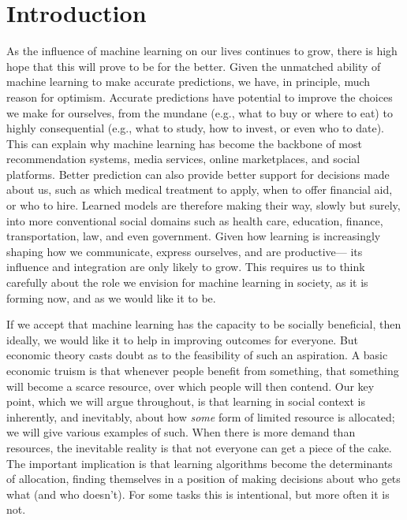 
\section{Introduction} \label{sec:intro}


As the influence of machine learning on our lives continues to grow,
there is high hope that this will prove to be for the better.
Given the unmatched ability of machine learning to make accurate predictions,
we have,
in principle,
much reason for optimism.
Accurate predictions have potential
to improve the choices we make for ourselves,
from the mundane (e.g., what to buy or where to eat)
to highly consequential (e.g., what to study, how to invest, or even who to date).
This can explain why 
machine learning has become 
the backbone of most
recommendation systems,
media services,
online marketplaces,
and social platforms.
Better prediction can also provide better support for
decisions made about us, such as
which medical treatment to apply,
when to offer financial aid,
or who to hire.
Learned models are therefore making their way,
slowly but surely,
into more conventional social domains
such as health care, 
education,
finance,
transportation,
law,
and even government.
Given how learning is increasingly shaping
how we communicate, express ourselves, and are productive---%
its influence and integration are only likely to grow.
This requires us to think carefully about the role we envision for machine learning in society, as it is forming now, and as we would like it to be.

If we accept that machine learning has the capacity to be socially beneficial, 
then ideally, we would like it to help in improving outcomes for everyone.
But economic theory casts doubt as to the feasibility of such an aspiration.
A basic economic truism is that
whenever people benefit from something,
that something will become a scarce resource,
over which people will then contend.
Our key point, which we will argue throughout,
is that learning in social context is inherently, and inevitably,
about how \emph{some} form of limited resource is allocated;
we will give various examples of such.
When there is more demand than resources,
the inevitable reality is that
not everyone can get a piece of the cake.
The important implication is that %
learning algorithms become the determinants of allocation,
finding themselves in a position of making
decisions about who gets what (and who doesn't). 
For some tasks this is intentional, but more often it is not.


